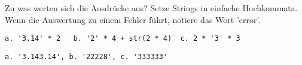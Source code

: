\question[3]
Zu was werten sich die Ausdrücke aus? Setze Strings in einfache Hochkommata.
Wenn die Auswertung zu einem Fehler führt, notiere das
Wort 'error'.

\begin{lstlisting}
a. '3.14' * 2   b. '2' * 4 + str(2 * 4)  c. 2 * '3' * 3
\end{lstlisting}
\begin{solutionbox}{2cm}
\begin{lstlisting}
a. '3.143.14', b. '22228', c. '333333'
\end{lstlisting}
\end{solutionbox}
